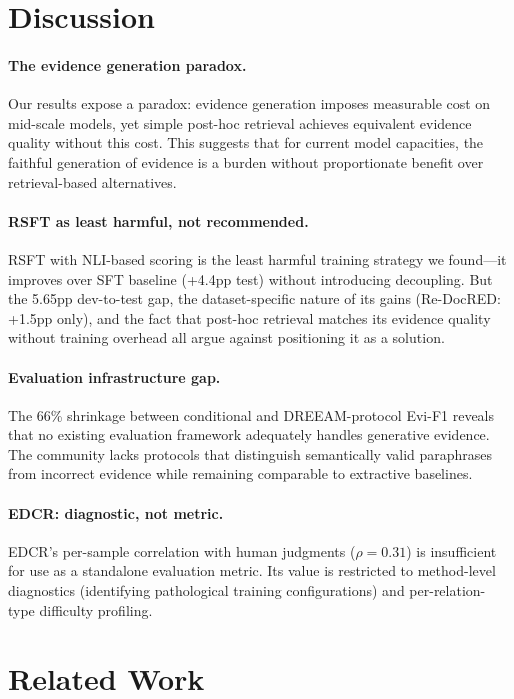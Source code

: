 \documentclass[11pt]{article}
\begin{document}
\section{Discussion}

\paragraph{The evidence generation paradox.} Our results expose a paradox: evidence generation imposes measurable cost on mid-scale models, yet simple post-hoc retrieval achieves equivalent evidence quality without this cost. This suggests that for current model capacities, the faithful generation of evidence is a burden without proportionate benefit over retrieval-based alternatives.

\paragraph{RSFT as least harmful, not recommended.} RSFT with NLI-based scoring is the least harmful training strategy we found---it improves over SFT baseline (+4.4pp test) without introducing decoupling. But the 5.65pp dev-to-test gap, the dataset-specific nature of its gains (Re-DocRED: +1.5pp only), and the fact that post-hoc retrieval matches its evidence quality without training overhead all argue against positioning it as a solution.

\paragraph{Evaluation infrastructure gap.} The 66\% shrinkage between conditional and DREEAM-protocol Evi-F1 reveals that no existing evaluation framework adequately handles generative evidence. The community lacks protocols that distinguish semantically valid paraphrases from incorrect evidence while remaining comparable to extractive baselines.

\paragraph{EDCR: diagnostic, not metric.} EDCR's per-sample correlation with human judgments ($\rho=0.31$) is insufficient for use as a standalone evaluation metric. Its value is restricted to method-level diagnostics (identifying pathological training configurations) and per-relation-type difficulty profiling.

\section{Related Work}
\end{document}
